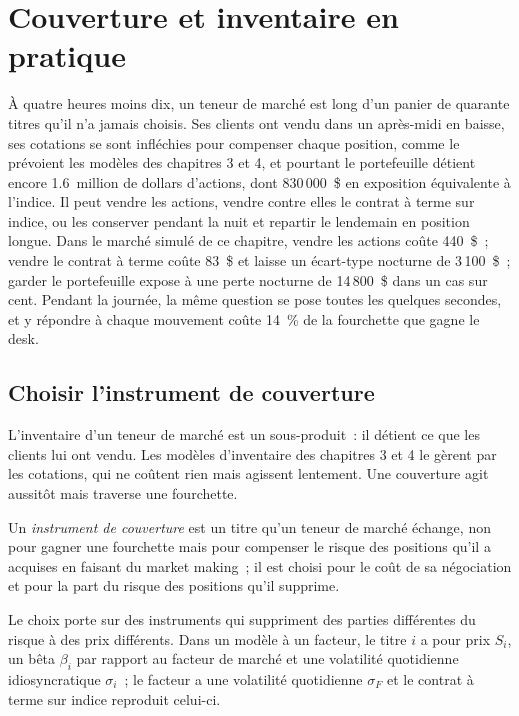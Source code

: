 \chapter{Couverture et inventaire en pratique}\label{ch:hf:hedging-and-inventory-in-practice}

À quatre heures moins dix, un teneur de marché est long d'un panier de quarante titres qu'il n'a jamais choisis. Ses clients ont vendu dans un après-midi en baisse, ses cotations se sont infléchies
pour compenser chaque position, comme le prévoient les modèles des chapitres 3 et 4, et pourtant le portefeuille détient encore 1.6~million de dollars d'actions, dont 830\,000~\$ en exposition équivalente à l'indice.
Il peut vendre les actions, vendre contre elles le contrat à terme sur indice, ou les conserver pendant la nuit et repartir le lendemain en position longue. Dans
le marché simulé de ce chapitre, vendre les actions coûte 440~\$~; vendre le contrat à terme coûte 83~\$ et laisse un écart-type nocturne de 3\,100~\$~;
garder le portefeuille expose à une perte nocturne de 14\,800~\$ dans un cas sur cent. Pendant la journée, la même question se pose toutes les quelques secondes, et y répondre
à chaque mouvement coûte 14~\% de la fourchette que gagne le desk.

\section{Choisir l'instrument de couverture}

L'inventaire d'un teneur de marché est un sous-produit~: il détient ce que les clients lui ont vendu. Les modèles d'inventaire des chapitres 3 et 4 le gèrent par les cotations,
qui ne coûtent rien mais agissent lentement. Une couverture agit aussitôt mais traverse une fourchette.

\begin{definition}\label{def:hf:hedging-and-inventory-in-practice:instrument}
Un \emph{instrument de couverture} est un titre qu'un teneur de marché échange, non pour gagner une fourchette mais pour compenser le risque des positions
qu'il a acquises en faisant du market making~; il est choisi pour le coût de sa négociation et pour la part du risque des positions qu'il supprime.
\end{definition}

Le choix porte sur des instruments qui suppriment des parties différentes du risque à des prix différents. Dans un modèle à un facteur, le titre $i$ a pour prix $S_i$, un
bêta $\beta_i$ par rapport au facteur de marché et une volatilité quotidienne idiosyncratique $\sigma_i$~; le facteur a une volatilité quotidienne $\sigma_F$ et le contrat à terme sur indice
reproduit celui-ci.

